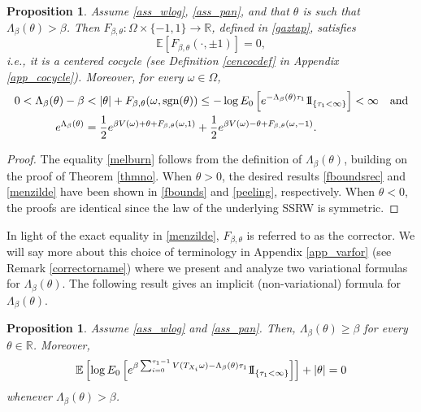 \documentclass[a4paper]{amsart}
\numberwithin{equation}{section}
\theoremstyle{plain}
\newtheorem{proposition}[theorem]{\sc Proposition}
\theoremstyle{remark}
\begin{document}
\begin{proposition}\label{cikmazde}
	Assume \eqref{ass_wlog}, \eqref{ass_pan},
	{}{and that $\theta$ is such that
	$\Lambda_\beta(\theta) > \beta$.} Then $F_{\beta,\theta}:\Omega\times\{-1,1\}\to\mathbb{R}$, defined in \eqref{gaztap}, satisfies
	\begin{equation}\label{melburn}
	\mathbb{E}[F_{\beta,\theta}(\cdot,\pm 1)] = 0,
	\end{equation}
	i.e., it is a centered cocycle (see Definition \ref{cencocdef} in Appendix \ref{app_cocycle}). Moreover, for every $\omega\in\Omega$,
	\begin{align}
	0 < \Lambda_\beta(\theta) - \beta &< |\theta| + F_{\beta,\theta}(\omega,\text{sgn}(\theta)) \le - \log E_0\left[e^{-\Lambda_\beta(\theta)\tau_1}{{{\rm 1\mkern-1.5mu}\!{\rm I}}}_{\{\tau_1<\infty\}}\right] < \infty\quad\text{and}\label{fboundsrec}\\
    e^{\Lambda_\beta(\theta)} &= \frac1{2}e^{\beta V(\omega) + \theta + F_{\beta,\theta}(\omega,1)} + \frac1{2}e^{\beta V(\omega) - \theta + F_{\beta,\theta}(\omega,-1)}.\label{menzilde}
    
    \end{align}
    
\end{proposition}
\begin{proof}
{}{  The equality \eqref{melburn} follows from the definition of
$\Lambda_\beta(\theta)$, building on the proof of Theorem \ref{thmno}.}
When $\theta > 0$, the desired results \eqref{fboundsrec} and
\eqref{menzilde} have been shown in \eqref{fbounds} and \eqref{peeling}, respectively.
When $\theta < 0$, the proofs are identical since the law of the underlying SSRW is symmetric.
\end{proof}

In light of the exact equality in \eqref{menzilde}, $F_{\beta,\theta}$ is referred to as the corrector. We will say more about this choice of terminology in Appendix \ref{app_varfor} (see Remark \ref{correctorname}) where we present and analyze two variational formulas for $\Lambda_\beta(\theta)$. The following result gives an implicit (non-variational) formula for $\Lambda_\beta(\theta)$.

\begin{proposition}\label{propimpfor}
	Assume \eqref{ass_wlog} and \eqref{ass_pan}. Then, $\Lambda_\beta(\theta) \ge \beta$ for every $\theta\in\mathbb{R}$. Moreover,
	\begin{equation}\label{impfor}
	\mathbb{E}\left[\log E_0\left[e^{\beta\sum_{i=0}^{\tau_1-1}V(T_{X_i}\omega) - \Lambda_\beta(\theta)\tau_1}{{{\rm 1\mkern-1.5mu}\!{\rm I}}}_{\{\tau_1<\infty\}}\right]\right] + |\theta| = 0
	\end{equation}
	whenever $\Lambda_\beta(\theta) > \beta$.
\end{proposition}
\end{document}
